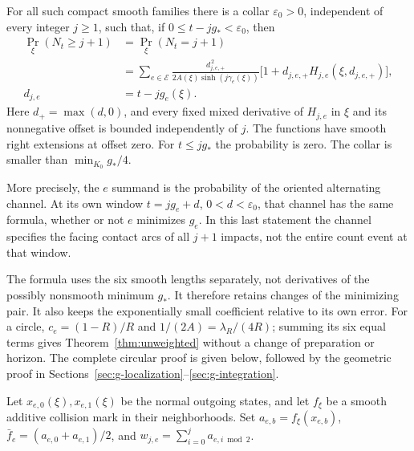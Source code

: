 \begin{theorem}
\label{thm:g-stability}
For all such compact smooth families there is a collar
$\varepsilon_0>0$, independent of every integer $j\ge1$, such that,
if $0\le t-jg_*<\varepsilon_0$, then
\begin{equation}\label{eq:g-competition}
 \begin{split}
 \Pr_\xi(N_t\ge j+1)&=\Pr_\xi(N_t=j+1)\\
 &=\sum_{e\in\mathcal E}
   \frac{d_{j,e,+}^{\,2}}{2A(\xi)\sinh(j\gamma_e(\xi))}
   \bigl[1+d_{j,e,+}H_{j,e}(\xi,d_{j,e,+})\bigr],\\
 d_{j,e}&=t-jg_e(\xi).
 \end{split}
\end{equation}
Here $d_+=\max(d,0)$, and every fixed mixed derivative of $H_{j,e}$
in $\xi$ and its nonnegative offset is bounded independently of $j$.
The functions have smooth right extensions at offset zero. For
$t\le jg_*$ the probability is zero. The collar is smaller than
$\min_{K_0}g_*/4$.

More precisely, the $e$ summand is the probability of the oriented
alternating channel. At its own window $t=jg_e+d$, $0<d<\varepsilon_0$,
that channel has the same formula, whether or not $e$ minimizes $g_e$.
In this last statement the channel specifies the facing contact arcs
of all $j+1$ impacts, not the entire count event at that window.
\end{theorem}

The formula uses the six smooth lengths separately, not derivatives of
the possibly nonsmooth minimum $g_*$. It therefore retains changes of
the minimizing pair. It also keeps the exponentially small coefficient
relative to its own error. For a circle, $c_e=(1-R)/R$ and
$1/(2A)=\lambda_R/(4R)$; summing its six equal terms gives
Theorem~\ref{thm:unweighted} without a change of preparation or horizon.
The complete circular proof is given below, followed by the geometric
proof in Sections~\ref{sec:g-localization}--\ref{sec:g-integration}.

Let $x_{e,0}(\xi),x_{e,1}(\xi)$ be the normal outgoing states, and
let $f_\xi$ be a smooth additive collision mark in their neighborhoods.
Set $a_{e,b}=f_\xi(x_{e,b})$, $\bar f_e=(a_{e,0}+a_{e,1})/2$, and
$w_{j,e}=\sum_{i=0}^j a_{e,i\bmod2}$.

